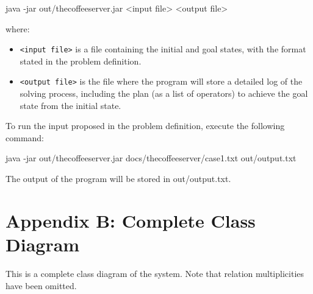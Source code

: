 \documentclass[12pt,a4paper,oneside]{article}
\numberwithin{equation}{section}
\numberwithin{equation}{section}
\theoremstyle{definition}
\begin{document}
\begin{itemize}
\begin{listing}[style=consola, numbers=none]
java -jar out/thecoffeeserver.jar <input file> <output file>
\end{listing}
where:
\begin{itemize}
	\item \texttt{<input file>} is a file containing the initial and goal states, with the format stated in the problem definition.
	\item \texttt{<output file>} is the file where the program will store a detailed log of the solving process, including the plan (as a list of operators) to achieve the goal state from the initial state.
\end{itemize}

To run the input proposed in the problem definition, execute the following command:

\begin{listing}[style=consola, numbers=none]
java -jar out/thecoffeeserver.jar docs/thecoffeeserver/case1.txt out/output.txt
\end{listing}

The output of the program will be stored in out/output.txt.



\newpage


\section*{Appendix B: Complete Class Diagram} \label{Complete Class Diagram}


This is a complete class diagram of the system. Note that relation multiplicities have been omitted.


\end{itemize}
\end{document}

